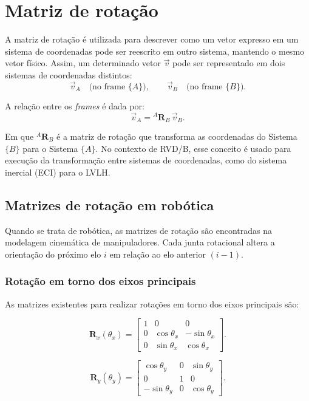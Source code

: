 \section{Matriz de rotação}

A matriz de rotação é utilizada para descrever como um vetor expresso em um sistema de coordenadas pode ser reescrito em outro sistema, mantendo o mesmo vetor físico. Assim, um determinado vetor $\vec{v}$ pode ser representado em dois sistemas de coordenadas distintos:
\begin{equation}
\vec{v}_A \quad \text{(no frame $\{A\}$)}, \qquad
\vec{v}_B \quad \text{(no frame $\{B\}$)}.
\end{equation}

A relação entre os \emph{frames} é dada por:
\begin{equation}
\vec{v}_A = {}^A \mathbf{R}_B \, \vec{v}_B.
\end{equation}

Em que ${}^A \mathbf{R}_B$ é a matriz de rotação que transforma as coordenadas do Sistema $\{B\}$ para o Sistema $\{A\}$.
No contexto de RVD/B, esse conceito é usado para execução da transformação entre sistemas de coordenadas, como do sistema inercial (ECI) para o LVLH.

\subsection{Matrizes de rotação em robótica}
Quando se trata de robótica, as matrizes de rotação são encontradas na modelagem cinemática de manipuladores.
Cada junta rotacional altera a orientação do próximo elo $i$ em relação ao elo anterior $(i-1)$.

\subsubsection{Rotação em torno dos eixos principais}
As matrizes existentes para realizar rotações em torno dos eixos principais são:

\begin{equation}
    \label{eq:rotacao_X}
\mathbf{R}_x(\theta_x) = 
\begin{bmatrix}
1 & 0              & 0 \\
0 & \cos\theta_x   & -\sin\theta_x \\
0 & \sin\theta_x   &  \cos\theta_x
\end{bmatrix}.
\end{equation}

\begin{equation}
    \label{eq:rotacao_Y}
\mathbf{R}_y(\theta_y) = 
\begin{bmatrix}
 \cos\theta_y  & 0 & \sin\theta_y \\
 0             & 1 & 0            \\
-\sin\theta_y  & 0 & \cos\theta_y
\end{bmatrix}.
\end{equation}

